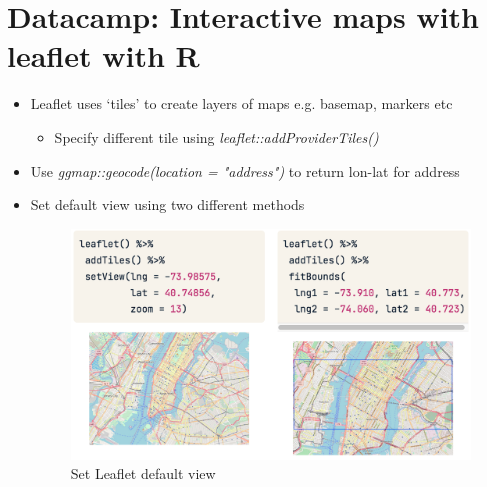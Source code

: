 \documentclass{article}
\begin{document}
\section{Datacamp: Interactive maps with leaflet with R}

\begin{itemize}
    \item Leaflet uses `tiles' to create layers of maps e.g. basemap, markers etc
    \begin{itemize}
        \item Specify different tile using \textit{leaflet::addProviderTiles()}
    \end{itemize}
    \item Use \textit{ggmap::geocode(location = "address")} to return lon-lat for address
    \item Set default view using two different methods
    
    \begin{figure}[h]
        \centering
        \caption{Set Leaflet default view}
        \label{leaflet default view}
        \includegraphics[width=14cm]{leaflet-default-view.png}
    \end{figure}
    

\end{itemize}
\end{document}
